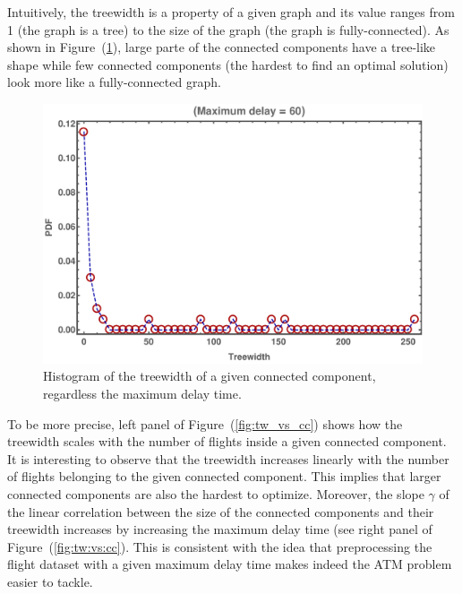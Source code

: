 Intuitively, the treewidth is a property of a given graph and its value ranges
from 1 (the graph is a tree) to the size of the graph (the graph is
fully-connected). As shown in Figure~(\ref{fig:hist_tw}), large parte of the
connected components have a tree-like shape while few connected components (the
hardest to find an optimal solution) look more like a fully-connected graph.

\begin{figure}
  \includegraphics[width=\columnwidth]{pics/instances/treewidth_histogram.pdf}
  \caption{\label{fig:hist_tw}Histogram of the treewidth of a given connected
  component, regardless the maximum delay time.}
\end{figure}

To be more precise, left panel of Figure~(\ref{fig:tw_vs_cc}) shows how the
treewidth scales with the number of flights inside a given connected component.
It is interesting to observe that the treewidth increases linearly with the
number of flights belonging to the given connected component. This implies that
larger connected components are also the hardest to optimize. Moreover, the
slope $\gamma$ of the linear correlation between the size of the connected
components and their treewidth increases by increasing the maximum delay time
(see right panel of Figure~(\ref{fig:tw:vs:cc}). This is consistent with the
idea that preprocessing the flight dataset with a given maximum delay time makes
indeed the ATM problem easier to tackle.

